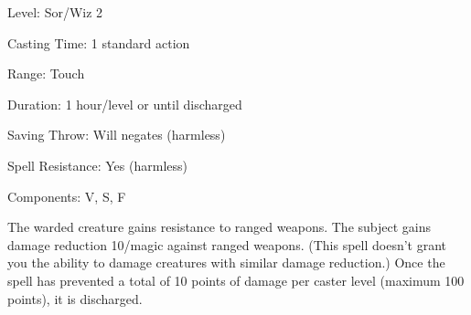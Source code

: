 
\begin{description*}
\item[Level:] Sor/Wiz 2
\item[Casting Time:] 1 standard action
\item[Range:] Touch
\item[Duration:] 1 hour/level or until discharged
\item[Saving Throw:] Will negates (harmless)
\item[Spell Resistance:] Yes (harmless)
\item[Components:] V, S, F
\end{description*}

The warded creature gains resistance to ranged weapons. The subject gains damage
reduction 10/magic against ranged weapons. (This spell doesn't grant you the ability
to damage creatures with similar damage reduction.) Once the spell has prevented
a total of 10 points of damage per caster level (maximum 100 points), it is discharged.